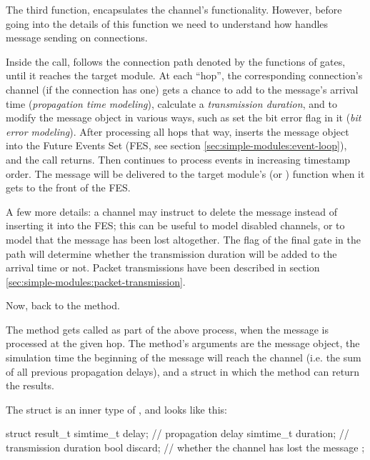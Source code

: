 The third function,  encapsulates the channel's
functionality. However, before going into the details of this function
we need to understand how {\opp} handles message sending on connections.

Inside the  call, {\opp} follows the
connection path denoted by the  functions of gates,
until it reaches the target module. At each ``hop'', the corresponding
connection's channel (if the connection has one) gets a chance to add to
the message's arrival time (\textit{propagation time modeling}), calculate a
\textit{transmission duration}, and to modify the message object in various
ways, such as set the bit error flag in it (\textit{bit error modeling}).
After processing all hops that way, {\opp} inserts the message object
into the Future Events Set (FES, see section
\ref{sec:simple-modules:event-loop}), and the  call returns.
Then {\opp} continues to process events in increasing timestamp order.
The message will be delivered to the target module's 
(or ) function when it gets to the front of the FES.

A few more details: a channel may instruct {\opp} to delete the message
instead of inserting it into the FES; this can be useful to model
disabled channels, or to model that the message has been lost altogether.
The  flag of the final gate in the path
will determine whether the transmission duration will be added to the
arrival time or not. Packet transmissions have been described in section
\ref{sec:simple-modules:packet-transmission}.

Now, back to the  method.

The method gets called as part of the above process, when the message
is processed at the given hop. The method's arguments are the message
object, the simulation time the beginning of the message will reach
the channel (i.e. the sum of all previous propagation delays),
and a struct in which the method can return the results.

The  struct is an inner type of ,
and looks like this:

\begin{cpp}
struct result_t {
    simtime_t delay;     // propagation delay
    simtime_t duration;  // transmission duration
    bool discard;        // whether the channel has lost the message
};
\end{cpp}

